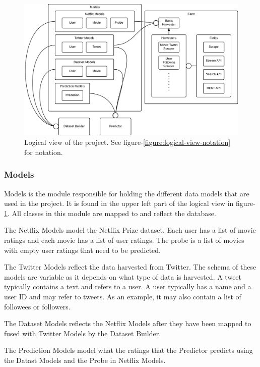 \begin{center}
\begin{figure}[H]
\centerline{\includegraphics[width=7in]{image/architecture-logical-view.png}}
\caption[Logical view of the project]{Logical view of the project. See figure-\ref{figure:logical-view-notation} for notation.}
\label{figure:logical-view}
\end{figure}
\end{center}

\subsubsection{Models}
Models is the module responsible for holding the different data models that are used in the project. It is found in the upper left part of the logical view in figure-\ref{figure:logical-view}. All classes in this module are mapped to and reflect the database.

The Netflix Models model the Netflix Prize dataset. Each user has a list of movie ratings and each movie has a list of user ratings. The probe is a list of movies with empty user ratings that need to be predicted.

The Twitter Models reflect the data harvested from Twitter. The schema of these models are variable as it depends on what type of data is harvested. A tweet typically contains a text and refers to a user. A user typically has a name and a user ID and may refer to tweets. As an example, it may also contain a list of followees or followers.

The Dataset Models reflects the Netflix Models after they have been mapped to fused with Twitter Models by the Dataset Builder.

The Prediction Models model what the ratings that the Predictor predicts using the Datast Models and the Probe in Netflix Models.

